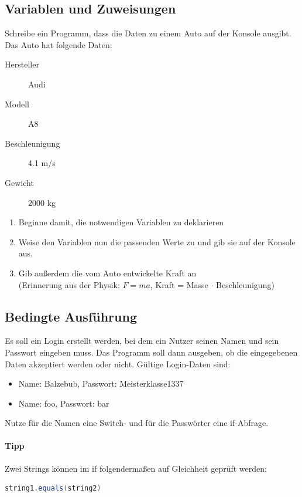 \documentclass[11pt, a4paper]{article}
\renewcommand{\vec}[1]{\underline{#1}}
\begin{document}
\subsection{Variablen und Zuweisungen}
Schreibe ein Programm, dass die Daten zu einem Auto auf der Konsole ausgibt. Das Auto hat folgende Daten:
\begin{description}
	\item[Hersteller] Audi
	\item[Modell] A8
	\item[Beschleunigung] 4.1 m/s
	\item[Gewicht] 2000 kg
\end{description}
\begin{enumerate}
	\item Beginne damit, die notwendigen Variablen zu deklarieren
	\item Weise den Variablen nun die passenden Werte zu und gib sie auf der Konsole aus.
	\item Gib außerdem die vom Auto entwickelte Kraft an \\
	(Erinnerung aus der Physik: $\vec{F}=m\vec{a}$, Kraft = Masse $\cdot$ Beschleunigung)
\end{enumerate}



\subsection{Bedingte Ausführung}
Es soll ein Login erstellt werden, bei dem ein Nutzer seinen Namen und sein Passwort eingeben muss. Das Programm soll dann ausgeben, ob die eingegebenen Daten akzeptiert werden oder nicht. Gültige Login-Daten sind:
\begin{itemize}
	\item Name: Balzebub, Passwort: Meisterklasse1337
	\item Name: foo, Passwort: bar
\end{itemize}
Nutze für die Namen eine Switch- und für die Passwörter eine if-Abfrage.
\paragraph{Tipp} Zwei Strings können im if folgendermaßen auf Gleichheit geprüft werden:
\begin{lstlisting}[language=Java]
	string1.equals(string2)
\end{lstlisting}


\end{document}
